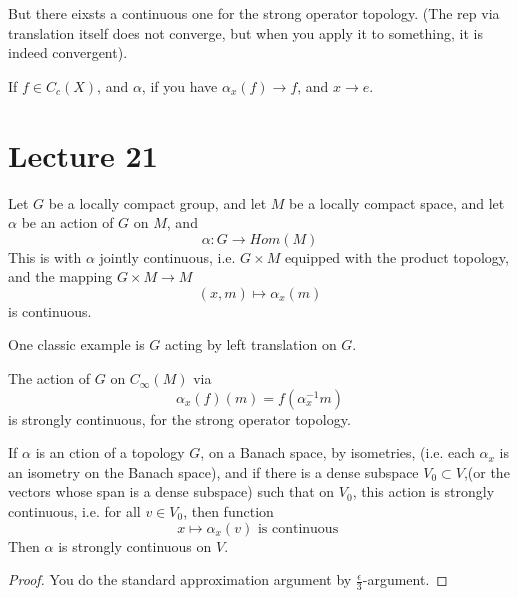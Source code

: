 But there eixsts a continuous one for the strong operator topology. (The rep via translation itself does not converge, but when you apply it to something, it is indeed convergent).
\begin{example}
    If $f\in C_c(X)$, and $\alpha$, if you have $\alpha_x(f)\to f$, and $x\to e$. 
\end{example}


\section{Lecture 21}
\begin{comment}
    If you have a $\sigma$-ring of subsets of a grou, and a measure on the $\sigma$-ring, if you have a translation invariant measure on the group, then you can give the group a topology, that is locally compact.
\end{comment}

Let $G$ be a locally compact group, and let $M$ be a locally compact space, and let $\alpha$ be an action of $G$ on $M$, and 
\begin{equation*}
    \alpha: G\to Hom(M)
\end{equation*}
This is with $\alpha$ jointly continuous, i.e. $G\times M$ equipped with the product topology, and the mapping $G\times M\to M$
\begin{equation*}
    (x, m)\mapsto \alpha_x(m)
\end{equation*}
is continuous.

One classic example is $G$ acting by left translation on $G$. 
\begin{theorem}
    The action of $G$ on $C_\infty(M)$ via
    \begin{equation*}
        \alpha_x(f)(m)=f(\alpha_x^{-1}m)
    \end{equation*}
    is strongly continuous, for the strong operator topology.
\end{theorem}

\begin{proposition}
    If $\alpha$ is an ction of a topology $G$, on a Banach space, by isometries, (i.e. each $\alpha_x$ is an isometry on the Banach space), and if there is a dense subspace $V_0\subset V$,(or the vectors whose span is a dense subspace) such that on $V_0$, this action is strongly continuous, i.e. for all $v\in V_0$, then function
    \begin{equation*}
        x\mapsto \alpha_x(v) \text{ is continuous }
    \end{equation*}
    Then $\alpha$ is strongly continuous on $V$.
\end{proposition}
\begin{proof}
    You do the standard approximation argument by $\frac{\epsilon}{3}$-argument.
\end{proof}

